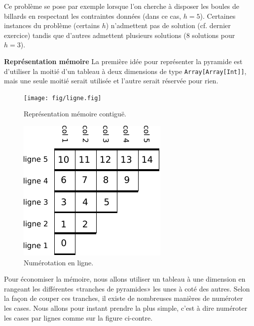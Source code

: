 \documentclass[10pt]{article}\usepackage[nu]{esial}
\begin{document}
\noindent Ce problème se pose par exemple lorsque l'on cherche à disposer les
boules de billards en respectant les contraintes données (dans ce cas,
$h=5$). Certaines instances du problème (certains $h$) n'admettent pas de
solution (cf. dernier exercice) tandis que d'autres admettent plusieurs
solutions (8 solutions pour $h=3$).

\begin{Exercice}\textbf{Représentation mémoire}
  \noindent La première idée pour représenter la pyramide est d'utiliser la
  moitié d'un tableau à deux dimensions de type \texttt{Array[Array[Int]]}, mais
  une seule moitié serait utilisée et l'autre serait réservée pour rien.
\end{Exercice}

\begin{figure}[h]
  \centering
  \texttt{[image: fig/ligne.fig]}\vspace{-.5\baselineskip}
  \caption{Représentation mémoire contiguë.}
  \label{fig:mem}%
\end{figure}

\begin{figure}
  \vspace{-1.2\baselineskip}
  \centerline{\includegraphics[scale=.9]{img/numerotation-ligne.pdf}}
  \vspace{-.5\baselineskip}
  \caption{Numérotation en ligne.}
  \label{fig:numligne}
  \vspace{-1.5\baselineskip}
  
\end{figure}

Pour économiser la mémoire, nous allons utiliser un tableau à une dimension en
rangeant les différentes «tranches de pyramides» les unes à coté des
autres. Selon la façon de couper ces tranches, il existe de nombreuses manières
de numéroter les cases. Nous allons pour instant prendre la plus simple, c'est à
dire numéroter les cases par lignes comme sur la figure ci-contre.
\end{document}
